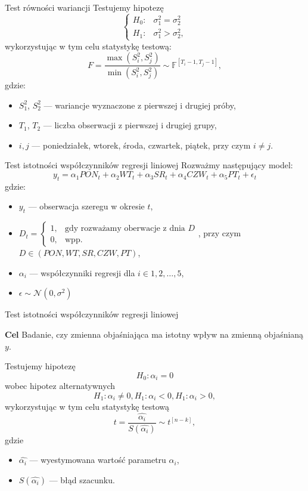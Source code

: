 \documentclass[a4paper, 11pt]{beamer}
\begin{document}
	\begin{frame}{Test równości wariancji}
		Testujemy hipotezę \[
				\begin{cases}
					H_{0}: & \sigma_1^2 = \sigma_2^2\\
					H_{1}: & \sigma_1^2 > \sigma_2^2,
				\end{cases}
			\]
		wykorzystując w tym celu statystykę testową: \[
				F=\frac{\max\left(S_i^2, S_j^2\right)}{\min\left(S_i^2, S_j^2\right)}  \sim \mathbb{F}^{[T_i-1, T_j-1]},
			\]
		gdzie:
		\begin{itemize}
			\item $S_1^2$, $S_2^2$ --- wariancje wyznaczone z pierwszej i drugiej próby,
			\item $T_1$, $T_2$ --- liczba obserwacji z pierwszej i drugiej grupy,
			\item $i,j$ --- poniedziałek, wtorek, środa, czwartek, piątek, przy czym $i \neq j$.
		\end{itemize}
	\end{frame}	
	
	\begin{frame}{Test istotności współczynników regresji liniowej}
		Rozważmy następujący model: \[
			y_t = \alpha_1 PON_t + \alpha_2 WT_t + \alpha_3 SR_t + \alpha_4 CZW_t + \alpha_5 PT_t + \epsilon_t
			\]
		gdzie:
		\begin{itemize}
			\item $y_t$ --- obserwacja szeregu w okresie $t$,
			\item $D_t =
				\left\{ \begin{array}{ll} 
					1,& \mbox{gdy rozważamy oberwacje z dnia } D\\
					0,& \mbox{wpp.}
				\end{array} \right.$, przy czym  $D \in \left(PON, WT, SR, CZW, PT\right)$,
			\item $\alpha_i$ --- współczynniki regresji dla $i \in 1,2,\ldots,5$,
			\item $\epsilon \sim \mathcal{N}(0,\sigma^2)$
		\end{itemize}
	\end{frame}
	
	\begin{frame}{Test istotności współczynników regresji liniowej}
		\begin{block}{\textbf{Cel}}
			Badanie, czy zmienna objaśniająca ma istotny wpływ na zmienną objaśnianą $y$.
		\end{block}
		Testujemy hipotezę \[  
		                    H_{0}: \alpha_i = 0
		                   \]
		wobec hipotez alternatywnych \[ 
		                              H_{1}: \alpha_i \neq 0, H_{1}: \alpha_i < 0, H_{1}: \alpha_i > 0,
		                             \]
		wykorzystując w tym celu statystykę testową \[
			t=\frac{\hat{\alpha_i}}{S\left(\hat{\alpha_i}\right)} \sim t^{\left[n-k\right]},
		\] gdzie
		\begin{itemize}
			\item $\hat{\alpha_i}$ --- wyestymowana wartość parametru $\alpha_i$,
			\item $S(\hat{\alpha_i})$ --- błąd szacunku.
		\end{itemize}
	\end{frame}
	
\end{document}
